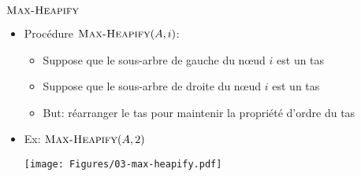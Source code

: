 


\begin{frame}{$\textnormal{\scshape Max-Heapify}$}

\begin{itemize}
\item Procédure $\textnormal{\scshape Max-Heapify}(A,i)$:
\begin{itemize}
\item Suppose que le sous-arbre de gauche du n\oe ud $i$ est un tas
\item Suppose que le sous-arbre de droite du n\oe ud $i$ est un tas
\item But: réarranger le tas pour maintenir la propriété d'ordre du tas
\end{itemize}
\item Ex: $\textnormal{\scshape Max-Heapify}(A,2)$
\centerline{\texttt{[image: Figures/03-max-heapify.pdf]}}
\end{itemize}

\end{frame}

